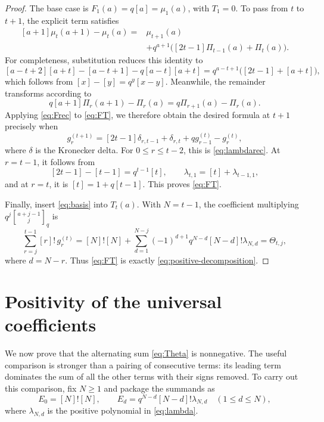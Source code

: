 \documentclass[11pt]{amsart}
\newcommand{\qbinom}[2]{\genfrac{[}{]}{0pt}{}{#1}{#2}_{q}}
\begin{document}
\begin{proof}
The base case is $F_1(a)=q[a]=\mu_1(a)$, with $T_1=0$.
To pass from $t$ to $t+1$, the explicit term satisfies
\begin{equation}\label{eq:murec}
\begin{split}
 [a+1]\mu_t(a+1)-\mu_t(a)
 ={}&\mu_{t+1}(a)\\
 &+q^{a+1}\bigl([2t-1]\Pi_{t-1}(a)+\Pi_t(a)\bigr).
\end{split}
\end{equation}
For completeness, substitution reduces this identity to
\[
 [a-t+2][a+t]-[a-t+1]-q[a-t][a+t]
 =q^{a-t+1}\bigl([2t-1]+[a+t]\bigr),
\]
which follows from $[x]-[y]=q^y[x-y]$.
Meanwhile, the remainder transforms according to
\[
 q[a+1]\Pi_r(a+1)-\Pi_r(a)=q\Pi_{r+1}(a)-\Pi_r(a).
\]
Applying \eqref{eq:Frec} to \eqref{eq:FT}, we therefore obtain the
desired formula at $t+1$ precisely when
\begin{equation}\label{eq:grec}
 g^{(t+1)}_r=[2t-1]\delta_{r,t-1}+\delta_{r,t}
       +qg^{(t)}_{r-1}-g^{(t)}_r,
\end{equation}
where $\delta$ is the Kronecker delta. For $0\le r\le t-2$, this is
\eqref{eq:lambdarec}. At $r=t-1$, it follows from
\[
 [2t-1]-[t-1]=q^{t-1}[t],\qquad
 \lambda_{t,1}=[t]+\lambda_{t-1,1},
\]
and at $r=t$, it is $[t]=1+q[t-1]$. This proves \eqref{eq:FT}.

Finally, insert \eqref{eq:basis} into $T_t(a)$. With $N=t-1$, the
coefficient multiplying $q^j\qbinom{a+j-1}{j}$ is
\[
 \sum_{r=j}^{t-1}[r]!\,g^{(t)}_r
 =[N]![N]+\sum_{d=1}^{N-j}(-1)^{d+1}q^{N-d}[N-d]!\lambda_{N,d}
 =\Theta_{t,j},
\]
where $d=N-r$. Thus \eqref{eq:FT} is exactly
\eqref{eq:positive-decomposition}.
\end{proof}

\section{Positivity of the universal coefficients}\label{sec:positivity}

We now prove that the alternating sum \eqref{eq:Theta} is nonnegative.
The useful comparison is stronger than a pairing of consecutive terms:
its leading term dominates the sum of all the other terms with their
signs removed. To carry out this comparison, fix $N\ge1$ and package
the summands as
\begin{equation}\label{eq:E}
 E_0=[N]![N],\qquad
 E_d=q^{N-d}[N-d]!\lambda_{N,d}\quad(1\le d\le N),
\end{equation}
where $\lambda_{N,d}$ is the positive polynomial in \eqref{eq:lambda}.
\end{document}
